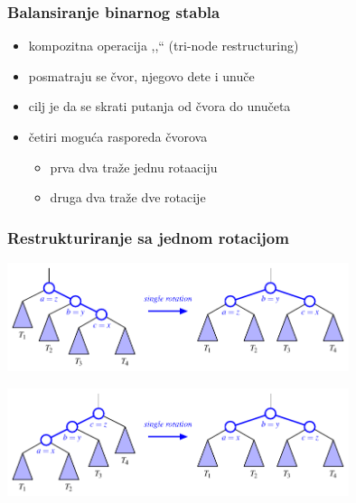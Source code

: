 \documentclass[compress]{beamer}
\begin{document}
\begin{frame}[fragile]
  \frametitle{Balansiranje binarnog stabla}
  \begin{itemize}
    \item kompozitna operacija ,,`` (tri-node restructuring)
    \item posmatraju se čvor, njegovo dete i unuče
    \item cilj je da se skrati putanja od čvora do unučeta
    \item četiri moguća rasporeda čvorova
    \begin{itemize}
      \item prva dva traže jednu rotaaciju
      \item druga dva traže dve rotacije
    \end{itemize}
  \end{itemize}
\end{frame}

\begin{frame}[fragile]
  \frametitle{Restrukturiranje sa jednom rotacijom}
  \begin{center}
    \includegraphics[width=10cm]{asp-11-pic10.pdf}
  \end{center}
  \begin{center}
    \includegraphics[width=10cm]{asp-11-pic11.pdf}
  \end{center}
\end{frame}
\end{document}
